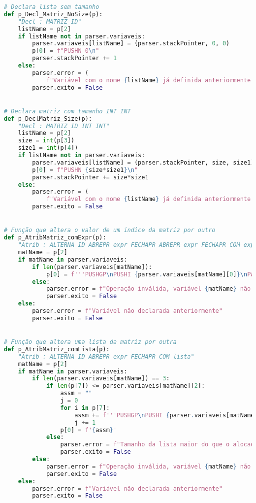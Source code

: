\documentclass[11pt,a4paper]{report}%
\begin{document}
\begin{scriptsize}
\begin{lstlisting}[language=python]
# Declara lista sem tamanho
def p_Decl_Matriz_NoSize(p):
    "Decl : MATRIZ ID"
    listName = p[2]
    if listName not in parser.variaveis:
        parser.variaveis[listName] = (parser.stackPointer, 0, 0)
        p[0] = f"PUSHN 0\n"
        parser.stackPointer += 1
    else:
        parser.error = (
            f"Variável com o nome {listName} já definida anteriormente.")
        parser.exito = False


# Declara matriz com tamanho INT INT
def p_DeclMatriz_Size(p):
    "Decl : MATRIZ ID INT INT"
    listName = p[2]
    size = int(p[3])
    size1 = int(p[4])
    if listName not in parser.variaveis:
        parser.variaveis[listName] = (parser.stackPointer, size, size1)
        p[0] = f"PUSHN {size*size1}\n"
        parser.stackPointer += size*size1
    else:
        parser.error = (
            f"Variável com o nome {listName} já definida anteriormente.")
        parser.exito = False


# Função que altera o valor de um indice da matriz por outro
def p_AtribMatriz_comExpr(p):
    "Atrib : ALTERNA ID ABREPR expr FECHAPR ABREPR expr FECHAPR COM expr"
    matName = p[2]
    if matName in parser.variaveis:
        if len(parser.variaveis[matName]):
            p[0] = f'''PUSHGP\nPUSHI {parser.variaveis[matName][0]}\nPADD\n{p[4]}PUSHI {parser.variaveis[matName][2]}MUL\nPADD\n{p[7]}{p[10]}STOREN\n'''
        else:
            parser.error = f"Operação inválida, variável {matName} não é uma matriz"
            parser.exito = False
    else:
        parser.error = f"Variável não declarada anteriormente"
        parser.exito = False


# Função que altera uma lista da matriz por outra
def p_AtribMatriz_comLista(p):
    "Atrib : ALTERNA ID ABREPR expr FECHAPR COM lista"
    matName = p[2]
    if matName in parser.variaveis:
        if len(parser.variaveis[matName]) == 3:
            if len(p[7]) <= parser.variaveis[matName][2]:
                assm = ""
                j = 0
                for i in p[7]:
                    assm += f'''PUSHGP\nPUSHI {parser.variaveis[matName][0]}\nPADD\n{p[4]}PUSHI {parser.variaveis[matName][2]}\nMUL\nPADD\nPUSHI {j}\nPUSHI {i}\nSTOREN\n'''
                    j += 1
                p[0] = f'{assm}'
            else:
                parser.error = f"Tamanho da lista maior do que o alocado"
                parser.exito = False
        else:
            parser.error = f"Operação inválida, variável {matName} não é uma matriz"
            parser.exito = False
    else:
        parser.error = f"Variável não declarada anteriormente"
        parser.exito = False



\end{lstlisting}
\end{scriptsize}
\end{document}
